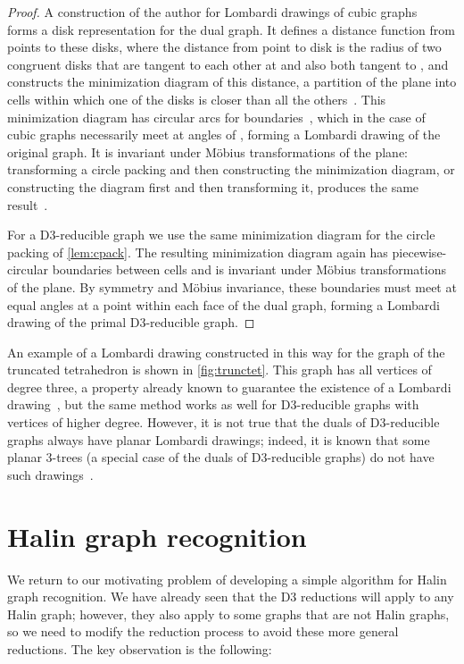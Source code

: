 \documentclass{article}
\begin{document}
\begin{proof}
A construction of the author for Lombardi drawings of cubic graphs~\cite{Epp-DCG-14} forms a disk representation for the dual graph.
It defines a distance function from points to these disks, where the distance from point  to disk  is the radius of two congruent disks that are tangent to each other at  and also both tangent to , and constructs the minimization diagram of this distance, a partition of the plane into cells within which one of the disks is closer than all the others~\cite[Sec.~3]{Epp-DCG-14}. This minimization diagram has circular arcs for boundaries~\cite[Lem.~2]{Epp-DCG-14}, which in the case of cubic graphs necessarily meet at angles of , forming a Lombardi drawing of the original graph. It is invariant under M\"obius transformations of the plane: transforming a circle packing and then constructing the minimization diagram, or constructing the diagram first and then transforming it, produces the same result~\cite[Lem.~1]{Epp-DCG-14}.

For a D3-reducible graph we use the same minimization diagram for the circle packing of \autoref{lem:cpack}.
The resulting minimization diagram again has piecewise-circular boundaries between cells and is invariant under M\"obius transformations of the plane. By symmetry and M\"obius invariance, these boundaries must meet at equal angles at a point within each face of the dual graph, forming a Lombardi drawing of the primal D3-reducible graph.
\end{proof}

An example of a Lombardi drawing constructed in this way for the graph of the truncated tetrahedron is shown in \autoref{fig:trunctet}. This graph has all vertices of degree three, a property already known to guarantee the existence of a Lombardi drawing~\cite{Epp-DCG-14}, but the same method works as well for D3-reducible graphs with vertices of higher degree. However, it is not true that the duals of D3-reducible graphs always have planar Lombardi drawings; indeed, it is known that some planar 3-trees (a special case of the duals of D3-reducible graphs) do not have such drawings~\cite{DunEppGoo-GD-11}.

\section{Halin graph recognition}

We return to our motivating problem of developing a simple algorithm for Halin graph recognition.
We have already seen that the D3 reductions will apply to any Halin graph; however, they also apply to some graphs that are not Halin graphs, so we need to modify the reduction process to avoid
these more general reductions. The key observation is the following:
\end{document}
